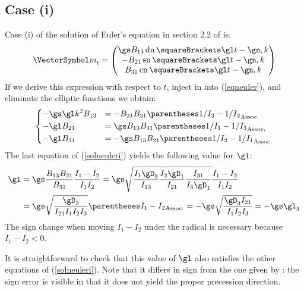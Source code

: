\documentclass[10pt, a4paper, twoside]{basestyle}
\begin{document}
\subsection*{Case (i)}
Case (i) of the solution of Euler's equation in section 2.2 of \cite{Celledoni2007} is:
\[
{\vm}_t =
\begin{pmatrix}
\gs B_{13} \JacobiDN\of{\gl t - \gn, k} \\
-B_{21} \JacobiSN\of{\gl t - \gn, k} \\
B_{31} \JacobiCN\of{\gl t - \gn, k}
\end{pmatrix}
\]
If we derive this expression with respect to $t$, inject in into (\ref{eqneuler}), and eliminate the elliptic functions we obtain:
\begin{equation}
\begin{dcases}
-\gs \gl k^2 B_{13} &= -B_{21} B_{31} \pa{1/I_3 - 1/I_2} \\
-\gl B_{21} &= \gs B_{13} B_{31} \pa{1/I_1 - 1/I_3} \\
-\gl B_{31} &= -\gs B_{13} B_{21} \pa{1/I_2 - 1/I_1}
\end{dcases}
\label{solneuleri}
\end{equation}
The last equation of (\ref{solneuleri}) yields the following value for $\gl$:
\begin{align*}
\gl &= \gs \frac{B_{13} B_{21}}{B_{31}} \frac{I_1 - I_2}{I_1 I_2}
= \gs\sqrt{\frac{I_1 \gD_3}{I_{13}} \frac{I_2 \gD_1}{I_{21}} \frac{I_{31}}{I_3 \gD_1}} \frac{I_1 - I_2}{I_1 I_2} \\
&= \gs\sqrt{\frac{\gD_3}{I_{21} I_1 I_2 I_3}} \pa{I_1 - I_2}
= -\gs\sqrt{\frac{\gD_3 I_{21}}{I_1 I_2 I_3}}
= -\gs \gl_3
\end{align*}
The sign change when moving $I_1 - I_2$ under the radical is necessary because $I_1 - I_2 < 0$.

It is straightforward to check that this value of $\gl$ also satisfies the other equations of (\ref{solneuleri}).  Note that it
differs in sign from the one given by \cite{Celledoni2007}: the sign error is visible in that it does not yield the proper precession 
direction.
\end{document}
